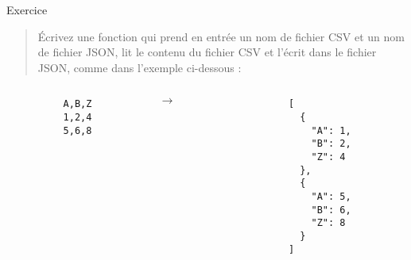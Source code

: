 \documentclass[10pt]{beamer}
\begin{document}
\begin{frame}[fragile]{Exercice}
  \begin{quote}
    Écrivez une fonction qui prend en entrée un nom de fichier CSV et un nom de fichier JSON, lit le contenu du fichier CSV et l'écrit dans le fichier JSON, comme dans l'exemple ci-dessous :
  \end{quote}

  \begin{columns}[c]
    \begin{column}{.45\linewidth}

      \begin{beamercodeblock}
        \begin{verbatim}
          A,B,Z
          1,2,4
          5,6,8
        \end{verbatim}
      \end{beamercodeblock}

    \end{column} \hfill
    \begin{column}{.05\linewidth}

      $\rightarrow$

    \end{column} \hfill
    \begin{column}{.45\linewidth}

      \begin{beamercodeblock}
        \begin{verbatim}
        [
          {
            "A": 1, 
            "B": 2, 
            "Z": 4
          },
          {
            "A": 5, 
            "B": 6, 
            "Z": 8
          }
        ]
        \end{verbatim}
      \end{beamercodeblock}

    \end{column} \hfill
  \end{columns}

\end{frame}
\end{document}
